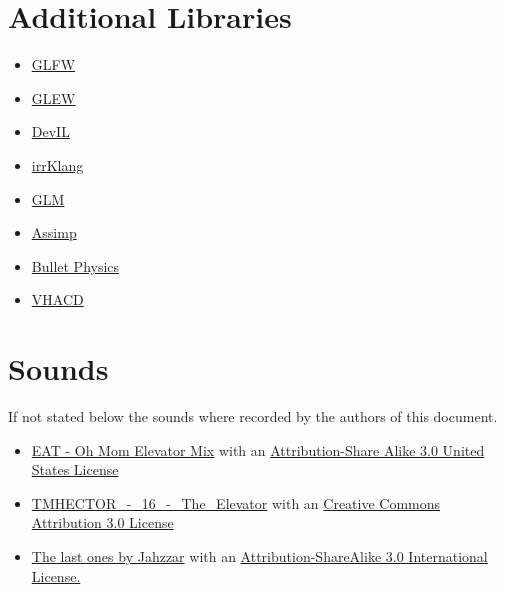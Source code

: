 \documentclass[12pt]{article}
\begin{document}
\section{Additional Libraries}

\begin{itemize}
\item \href{http://www.glfw.org/}{GLFW}
\item \href{http://glew.sourceforge.net/}{GLEW}
\item \href{http://openil.sourceforge.net/}{DevIL}
\item \href{http://www.ambiera.com/irrklang/index.html}{irrKlang}
\item \href{http://glm.g-truc.net}{GLM }
\item \href{http://www.assimp.org}{Assimp}
\item \href{http://bulletphysics.org/}{Bullet Physics}
\item \href{https://github.com/kmammou/v-hacd}{VHACD}
\end{itemize}


\section{Sounds}
If not stated below the sounds where recorded by the authors of this document.
\begin{itemize}
\item \href{http://freemusicarchive.org/music/EAT/20100129104001364/Oh_Mom_Elevator_Mix}{EAT - Oh Mom Elevator Mix} with an \href{http://creativecommons.org/licenses/by-sa/3.0/us/}{Attribution-Share Alike 3.0 United States License}
\item \href{http://freemusicarchive.org/music/TMHECTOR/The_Haunted_Mansion/DS10Forumcom\_-\_DS10Forumcom\_-\_The_Haunted_Mansion\_-\_16\_The\_Elevator}{TMHECTOR\_-\_16\_-\_The\_Elevator} with an \href{http://creativecommons.org/licenses/by/3.0/}{Creative Commons Attribution 3.0 License}
\item \href{http://freemusicarchive.org/music/Jahzzar/Smoke_Factory/The_last_ones}{The last ones by Jahzzar} with an \href{http://creativecommons.org/licenses/by-sa/3.0/}{Attribution-ShareAlike 3.0 International License.}
\end{itemize}



\end{document}
